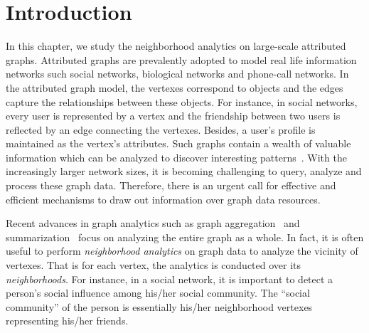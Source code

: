 \section{Introduction}

In this chapter, we study the neighborhood analytics
on large-scale attributed graphs. 
Attributed graphs are prevalently adopted to model 
real life information networks such social networks, 
biological networks and phone-call networks. 
In the attributed graph model, the vertexes correspond to objects and 
the edges capture the relationships between these objects. 
For instance, in social networks, every user is 
represented by a vertex and the friendship between two 
users is reflected by an edge connecting the vertexes. 
Besides, a user's profile is maintained as the vertex's attributes.
Such graphs contain a wealth of valuable information which can be analyzed to 
discover interesting patterns~\cite{chen2008graph,zhao2011graph,wang2014pagrol,tian2008efficient}.  
With the increasingly larger network sizes, 
it is becoming challenging to query, analyze and process 
these graph data. Therefore, there is an urgent call 
for effective and efficient mechanisms to draw out
information over graph data resources.

%

Recent advances in graph analytics such as graph aggregation~\cite{zhao2011graph,wang2014pagrol} and 
summarization~\cite{chen2008graph,tian2008efficient} focus on analyzing the entire graph as a whole. 
In fact, it is often useful to perform \emph{neighborhood
analytics} on graph data to analyze the vicinity of vertexes. 
That is for each vertex, the analytics is conducted over its \emph{neighborhoods}. 
For instance, in a social network, it is important to detect 
a person's social influence among his/her social community. 
The ``social community'' of the person is essentially his/her neighborhood vertexes representing his/her friends.



